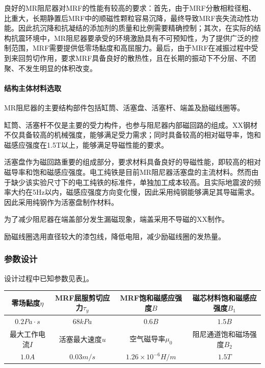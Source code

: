 良好的MR阻尼器对MRF的性能有较高的要求：首先，由于MRF分散相粒径粗、比重大，长期静置后MRF中的顺磁性颗粒容易沉降，最终导致MRF丧失流动性功能。因此抗沉降和抗凝结的添加剂的质量和比例需要精确控制；其次，在实际的结构抗震环境中，MR阻尼器要承受的环境激励具有不可预知性，为了提供广泛的控制范围，MRF需要提供低零场黏度和高屈服力。最后，由于MRF在减振过程中受到来回剪切作用，要求MRF具备良好的散热性，且在长期的振动下不分层、不团聚、不发生明显的体积改变。

\paragraph{结构主体材料选取}

\qquad MR阻尼器的主要结构部件包括缸筒、活塞盘、活塞杆、端盖及励磁线圈等。

缸筒、活塞杆不仅是主要的受力构件，也参与阻尼器内部磁回路的组成。XX钢材不仅具备较高的机械强度，能够满足受力需求；同时具备较高的相对磁导率，饱和磁感应强度在1.5T以上，能够满足导磁性能的要求。

活塞盘作为磁回路重要的组成部分，要求材料具备良好的导磁性能，即较高的相对磁导率和饱和磁感应强度。电工纯铁是目前MR阻尼器活塞盘的主流材料。然而由于缺少该实验尺寸下的电工纯铁的标准件，单独加工成本较高。且实际地震波的频率大约在5Hz以内，磁感应强度方向变化慢，因此采用纯钢能够满足其导磁需求。因此采用纯钢作为活塞盘制作材料。

为了减少阻尼器在端盖部分发生漏磁现象，端盖采用不导磁的XX制作。

励磁线圈选用直径较大的漆包线，降低电阻，减少励磁线圈的发热量。

\subsubsection{参数设计}

设计过程中已知参数见表\ref{init}。
\begin{table}[H]
\centering
\label{init}
\footnotesize
\begin{tabular}{|c|c|c|c|}
\hline 零场黏度$\eta$ & MRF屈服剪切应力$\tau_y$ & MRF饱和磁感应强度$B$ & 磁芯材料饱和磁感应强度$B_1$ \\
\hline $0.2Pa\cdot s$ & $68kPa$ & $0.6B$ & $1.5B$ \\
\hline 最大工作电流$I$ & 活塞最大速度$u$ & 空气磁导率$\mu_0$ & 阻尼通道饱和磁场强度$B_2$ \\
\hline $1.0A$ & $0.03m/s$ & $1.26\times10^{-6}H/m$ & $1.5T$ \\
\hline
\end{tabular}
\end{table}



